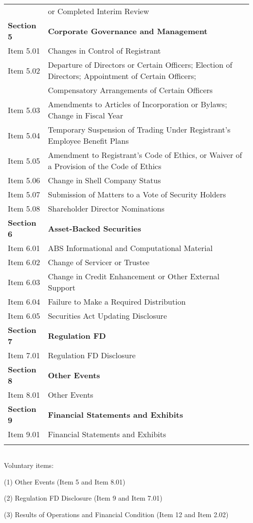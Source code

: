 \begin{table}[H]
\begin{tabular}{ll}
              & or Completed Interim Review \\
    \textbf{Section 5} & \textbf{Corporate Governance and Management} \\
    Item 5.01 & Changes in Control of Registrant \\
    Item 5.02 & Departure of Directors or Certain Officers; Election of Directors; Appointment of Certain Officers; \\
              & Compensatory Arrangements of Certain Officers \\
    Item 5.03 & Amendments to Articles of Incorporation or Bylaws; Change in Fiscal Year \\
    Item 5.04 & Temporary Suspension of Trading Under Registrant's Employee Benefit Plans \\
    Item 5.05 & Amendment to Registrant's Code of Ethics, or Waiver of a Provision of the Code of Ethics \\
    Item 5.06 & Change in Shell Company Status \\
    Item 5.07 & Submission of Matters to a Vote of Security Holders \\
    Item 5.08 & Shareholder Director Nominations \\
    \textbf{Section 6} & \textbf{Asset-Backed Securities} \\
    Item 6.01 & ABS Informational and Computational Material \\
    Item 6.02 & Change of Servicer or Trustee \\
    Item 6.03 & Change in Credit Enhancement or Other External Support \\
    Item 6.04 & Failure to Make a Required Distribution \\
    Item 6.05 & Securities Act Updating Disclosure \\
    \textbf{Section 7} & \textbf{Regulation FD} \\
    Item 7.01 & Regulation FD Disclosure \\
    \textbf{Section 8} & \textbf{Other Events} \\
    Item 8.01 & Other Events \\
    \textbf{Section 9} & \textbf{Financial Statements and Exhibits} \\
    Item 9.01 & Financial Statements and Exhibits \\
              & 
    \end{tabular}%

\begin{tabular}{l}
\end{tabular}
\end{table}%
Voluntary items: 

(1) Other Events (Item 5 and Item 8.01)

(2) Regulation FD Disclosure (Item 9 and Item 7.01)

(3) Results of Operations and Financial Condition (Item 12 and Item 2.02)

